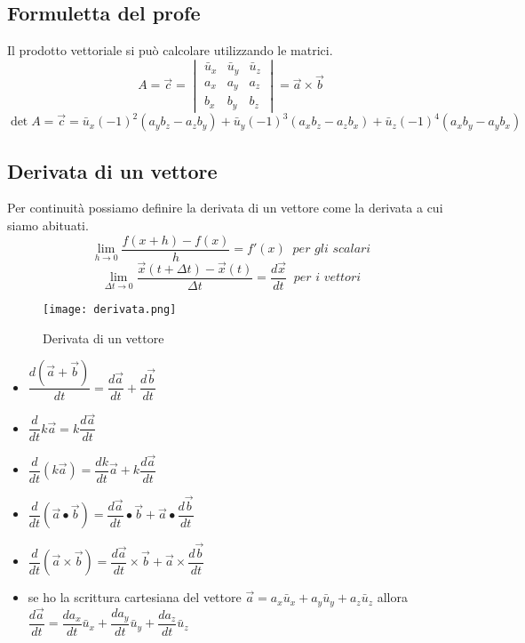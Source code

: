 \documentclass[../../main.tex]{subfiles}
\begin{document}
\subsection{Formuletta del profe}
Il prodotto vettoriale si può calcolare utilizzando le matrici.
\[
    A = \vec{c} = \begin{vmatrix}
        \bar{u}_x & \bar{u}_y & \bar{u}_z \\
        a_x       & a_y       & a_z       \\
        b_x       & b_y       & b_z
    \end{vmatrix} = \vec{a} \times \vec{b}
\]
\[
    \det{A} = \vec{c} = \bar{u}_x(-1)^2(a_yb_z - a_zb_y) + \bar{u}_y(-1)^3(a_xb_z - a_zb_x) + \bar{u}_z(-1)^4(a_xb_y - a_yb_x)
\]

\subsection{Derivata di un vettore}
Per continuità possiamo definire la derivata di un vettore come la derivata a cui siamo abituati.
\[
    \lim_{h \to 0} \dfrac{f(x+h) - f(x)}{h} = f'(x) \ \textit{ per gli scalari}
\]
\[
    \lim_{\Delta t \to 0} \dfrac{\vec{x}(t + \Delta t) - \vec{x}(t)}{\Delta t} = \dfrac{d\vec{x}}{dt} \ \textit{ per i vettori}
\]
\begin{figure}[h!]
    \centering
    \texttt{[image: derivata.png]}
    \caption{Derivata di un vettore}
\end{figure}

\begin{itemize}
    \item $\dfrac{d(\vec{a} + \vec{b})}{dt} = \dfrac{d\vec{a}}{dt} + \dfrac{d\vec{b}}{dt}$
    \item $\dfrac{d}{dt} k\vec{a} = k\dfrac{d\vec{a}}{dt}$
    \item $\dfrac{d}{dt} (k\vec{a}) = \dfrac{dk}{dt}\vec{a} + k\dfrac{d\vec{a}}{dt}$
    \item $\dfrac{d}{dt} (\vec{a} \bullet \vec{b}) = \dfrac{d\vec{a}}{dt} \bullet \vec{b} + \vec{a} \bullet \dfrac{d\vec{b}}{dt}$
    \item $\dfrac{d}{dt} (\vec{a} \times \vec{b}) = \dfrac{d\vec{a}}{dt} \times \vec{b} + \vec{a} \times \dfrac{d\vec{b}}{dt}$
    \item se ho la scrittura cartesiana del vettore $\vec{a} = a_x\bar{u}_x + a_y\bar{u}_y + a_z\bar{u}_z$ allora $\dfrac{d\vec{a}}{dt} = \dfrac{da_x}{dt}\bar{u}_x + \dfrac{da_y}{dt}\bar{u}_y + \dfrac{da_z}{dt}\bar{u}_z$
\end{itemize}
\end{document}
